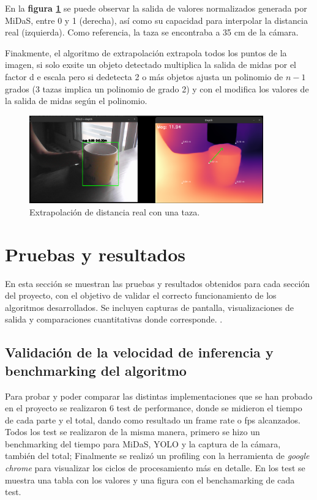 En la \textbf{figura \ref{fig:taza_extrapolacion}} se puede observar la salida de valores normalizados generada por MiDaS, entre 0 y 1 (derecha), así como su capacidad para interpolar la distancia real (izquierda). Como referencia, la taza se encontraba a 35 cm de la cámara.

Finakmente, el algoritmo de extrapolación extrapola todos los puntos de la imagen, si solo exsite un objeto detectado multiplica la salida de midas por el factor d e escala pero si dedetecta 2 o más objetos ajusta un polinomio de $n-1$ grados (3 tazas implica un polinomio de grado 2) y con el modifica los valores de la salida de midas según el polinomio.



\begin{figure}[h]
    \centering
    \includegraphics[width=0.9\textwidth]{images/extrapolacion_taza.png}
    \caption{Extrapolación de distancia real con una taza.}
    \label{fig:taza_extrapolacion}
\end{figure}



  \chapter{Pruebas y resultados}
En esta sección se muestran las pruebas y resultados obtenidos para cada sección del proyecto, con el objetivo de validar el correcto funcionamiento de los algoritmos desarrollados. Se incluyen capturas de pantalla, visualizaciones de salida y comparaciones cuantitativas donde corresponde.
.

    \section{Validación de la velocidad de inferencia y benchmarking del algoritmo}
Para probar y poder comparar las distintas implementaciones que se han probado en el proyecto se realizaron 6 test de performance, donde se midieron el tiempo de cada parte y el total, dando como resultado un frame rate o fps alcanzados. Todos los test se realizaron de la misma manera, primero se hizo un benchmarking del tiempo para MiDaS, YOLO y la captura de la cámara, también del total; Finalmente se realizó un profiling con la herramienta de \textit{google chrome} para visualizar los ciclos de procesamiento más en detalle. En los test se muestra una tabla con los valores y una figura con el benchamarking de cada test. 

